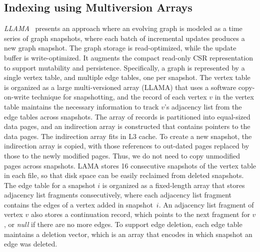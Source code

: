 \documentclass{svjour3}
\begin{document}
\subsection{Indexing using Multiversion Arrays}
{\em LLAMA}~\cite{macko2015llama} presents an approach where an evolving graph is modeled as a time series of graph snapshots, where each batch of incremental updates produces a new graph snapshot. The graph storage is read-optimized, while the update buffer is write-optimized. 
It augments the compact read-only CSR representation to support mutability and persistence. Specifically, a graph is represented by a single vertex table, and multiple edge tables, one per snapshot. The vertex table is organized as a large multi-versioned array (LLAMA) that uses a software copy-on-write technique for snapshotting, and the record of each vertex $v$ in the vertex table maintains the necessary information to track $v$'s adjacency list from the edge tables across snapshots. 
The array of records is partitioned into equal-sized data pages, and an indirection array is constructed that contains pointers to the data pages. The indirection array fits in L3 cache. To create a new snapshot, the indirection array is copied, with those references to out-dated pages replaced by those to the newly modified pages. Thus, we do not need to copy unmodified pages across snapshots. LAMA stores 16 consecutive snapshots of the vertex table in each file, so that disk space can be easily reclaimed from deleted snapshots. 
The edge table for a snapshot $i$ is organized as a fixed-length array that stores adjacency list fragments consecutively, where each adjacency list fragment contains the edges of a vertex added in snapshot~$i$. An adjacency list fragment of vertex $v$ also stores a continuation record, which points to the next fragment for $v$, or {\em null} if there are no more edges. To support edge deletion, each edge table maintains a deletion vector, which is an array that encodes in which snapshot an edge was deleted.


\end{document}
